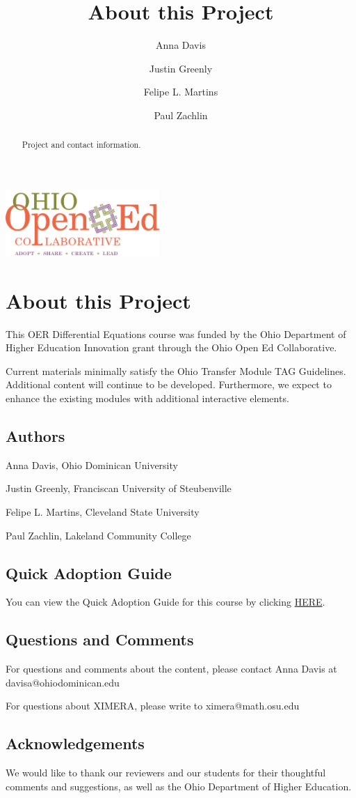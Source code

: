 \documentclass{ximera}
\author{Anna Davis \and Justin Greenly \and Felipe L. Martins \and Paul Zachlin}
\title{About this Project} \license{CC-BY 4.0}
\begin{document}
\begin{abstract}
 Project and contact information.
\end{abstract}
\maketitle

\begin{image}
\includegraphics[height=1in]{ooec.jpg}
\end{image}

\section{About this Project}
This OER Differential Equations course was funded by the Ohio Department of Higher Education Innovation grant through the Ohio Open Ed Collaborative. 

Current materials minimally satisfy the Ohio Transfer Module TAG Guidelines.  Additional content will continue to be developed.  Furthermore, we expect to enhance the existing modules with additional interactive elements.

\subsection{Authors}
Anna Davis, Ohio Dominican University

Justin Greenly, Franciscan University of Steubenville

Felipe L. Martins, Cleveland State University

Paul Zachlin, Lakeland Community College

\subsection{Quick Adoption Guide}
You can view the Quick Adoption Guide for this course by clicking
\href{https://docs.google.com/document/d/10qFH0S0MzIWAvadk9WHzI1j8xbJg7CKQ0D2J0eVziCM/edit?usp=sharing}{HERE}.

\subsection{Questions and Comments}
For questions and comments about the content, please contact Anna Davis at davisa@ohiodominican.edu

For questions about XIMERA, please write to ximera@math.osu.edu

\subsection{Acknowledgements}
We would like to thank our reviewers and our students for their thoughtful comments and suggestions, as well as the Ohio Department of Higher Education.
\end{document}
